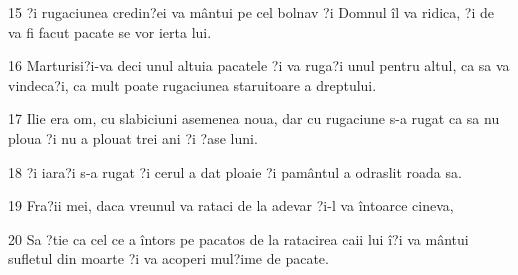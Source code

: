 \par 15 ?i rugaciunea credin?ei va mântui pe cel bolnav ?i Domnul îl va ridica, ?i de va fi facut pacate se vor ierta lui.
\par 16 Marturisi?i-va deci unul altuia pacatele ?i va ruga?i unul pentru altul, ca sa va vindeca?i, ca mult poate rugaciunea staruitoare a dreptului.
\par 17 Ilie era om, cu slabiciuni asemenea noua, dar cu rugaciune s-a rugat ca sa nu ploua ?i nu a plouat trei ani ?i ?ase luni.
\par 18 ?i iara?i s-a rugat ?i cerul a dat ploaie ?i pamântul a odraslit roada sa.
\par 19 Fra?ii mei, daca vreunul va rataci de la adevar ?i-l va întoarce cineva,
\par 20 Sa ?tie ca cel ce a întors pe pacatos de la ratacirea caii lui î?i va mântui sufletul din moarte ?i va acoperi mul?ime de pacate.


